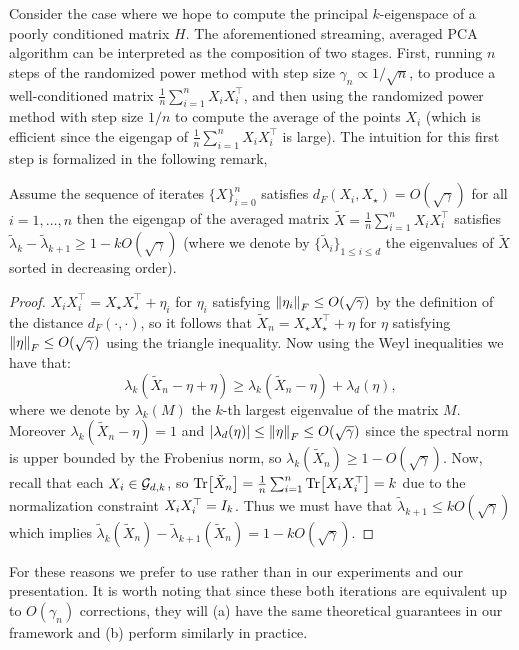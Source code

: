 Consider the case where we hope to compute the principal $k$-eigenspace of a poorly conditioned matrix $H$. The aforementioned streaming, averaged PCA algorithm can be interpreted as the composition of two stages. First, running $n$ steps of the randomized power method with step size $\gamma_n\propto1/\sqrt{n}$, to produce a well-conditioned matrix $\frac{1}{n}\sum_{i=1}^nX_iX_i^\top$, and then using the randomized power method with step size $1/n$ to compute the average of the points $X_i$ (which is efficient since the eigengap of $\frac{1}{n}\sum_{i=1}^nX_iX_i^\top$ is large). The intuition for this first step is formalized in the following remark,
\begin{remark}
  Assume the sequence of iterates $\{ X \}_{i=0}^{n}$ satisfies $d_F(X_i, X_\star) =  {O}(\sqrt{\gamma})$ for all $i=1, \dots, n$ then the eigengap of the averaged matrix $\tilde{X} = \frac{1}{n} \sum_{i=1}^{n} X_i X_i^\top$ satisfies $\tilde \lambda_{k}-\tilde \lambda_{k+1} \geq 1-kO(\sqrt{\gamma})$ (where we denote by $\{\tilde \lambda_i\}_{1\leq i\leq d}$ the eigenvalues of $\tilde X$ sorted in decreasing order).
\end{remark}
\begin{proof}
  $X_i X_i^\top = X_\star X_\star^\top + \eta_i$ for $\eta_i$ satisfying $\norm{\eta_i}_{F} \leq O(\sqrt{\gamma})$ by the definition of the distance $d_{F}(\cdot, \cdot)$, so it follows that
  $\tilde{X}_n = X_\star X_\star^{\top} + \eta$ for $\eta$ satisfying $\norm{\eta}_{F} \leq O(\sqrt{\gamma})$ using the triangle inequality.
  Now using the Weyl inequalities \citep{horn1990matrix} we have that:
  \[
    \lambda_{k}(\tilde{X}_n - \eta + \eta) \geq \lambda_{k}(\tilde{X}_n - \eta) + \lambda_d(\eta),
  \]
  where we denote by $\lambda_k(M)$ the $k$-th largest eigenvalue of the matrix $M$. Moreover $\lambda_{k}(\tilde{X}_n - \eta)=1$ and $|\lambda_d(\eta)| \leq \norm{\eta}_F \leq O(\sqrt{\gamma})$ since the spectral norm is upper bounded by the Frobenius norm, so
  $\lambda_{k}(\tilde{X}_n) \geq 1-O(\sqrt{\gamma})$.
  Now, recall that each $X_i \in \mathcal{G}_{d,k}$, so $\Tr[\tilde{X}_n]= \frac{1}{n} \sum_{i=1}^{n} \Tr[X_i X_i^\top] = k$ due to the normalization constraint $X_i X_i^\top = I_{k}$.
 Thus we must have that $\tilde \lambda_{k+1} \leq k O(\sqrt{\gamma})$ which implies $\tilde \lambda_k(\tilde{X}_n)-\tilde\lambda_{k+1}(\tilde{X}_n) = 1-kO(\sqrt{\gamma})$.
\end{proof}
For these reasons we prefer to use  rather than  in our experiments and our presentation. It is worth noting that since these both iterations are equivalent up to $O(\gamma_n)$ corrections, they will (a) have the same theoretical guarantees in our framework and (b) perform similarly in practice.

